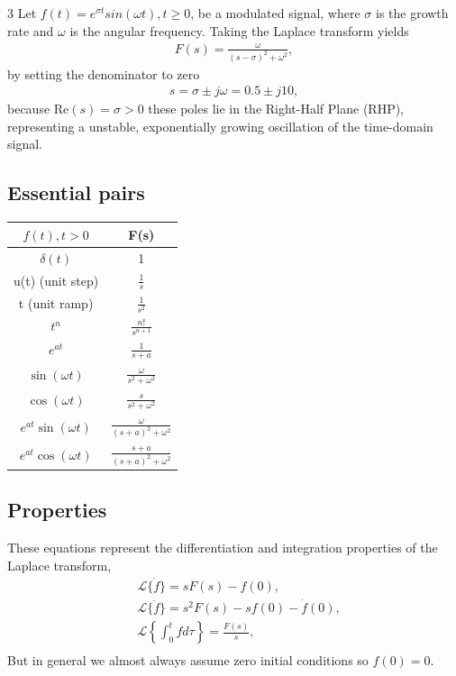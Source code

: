 \documentclass[10pt,landscape]{article}
\newcommand{\real}{\textrm{Re}}
\begin{document}
\begin{multicols*}{3}
    Let $f(t)=e^{\sigma t}sin(\omega t), t\geq0$, be a modulated signal, where $\sigma$ is the growth rate and $\omega$ is the angular frequency.
    Taking the Laplace transform yields
    \begin{align*}
        F(s)=\frac{\omega}{(s-\sigma)^2+\omega^2},
    \end{align*}
    by setting the denominator to zero
    \begin{align*}
        \boxed{s = \sigma \pm j\omega = 0.5 \pm j10},
    \end{align*}
    because $\real(s)=\sigma>0$ these poles lie in the Right-Half Plane (RHP), representing a unstable, exponentially growing oscillation of the time-domain signal. 
    
    \subsection{Essential pairs}

    \renewcommand{\arraystretch}{1.3}
    \begin{center}
    \begin{tabular}{cc}
    \hline
    $f(t), t>0 $                & F(s)        \\
        \hline
        $\delta (t)$            & 1           \\
        u(t) (unit step)        & $\frac{1}{s}$ \\ 
        t (unit ramp)           & $\frac{1}{s^2}$ \\ 
        $t^n$                   & $\frac{n!}{s^{n+1}}$ \\
        $e^{at}$                & $\frac{1}{s+a}$ \\
        $\sin (\omega t)$       & $\frac{\omega}{s^2+\omega^2}$ \\
        $\cos (\omega t)$       & $\frac{s}{s^2+\omega^2}$ \\
        $e^{at}\sin (\omega t)$ & $\frac{\omega}{(s+a)^2+\omega^2}$ \\
        $e^{at}\cos (\omega t)$ & $\frac{s+a}{(s+a)^2+\omega^2}$ \\

    \end{tabular}
    \end{center}

    \subsection{Properties}
    These equations represent the differentiation and integration properties of the Laplace transform,
    \begin{align*}
        &\mathcal{L}\{\dot{f}\} =sF(s)-f(0), \\
        &\mathcal{L}\{\ddot{f}\}=s^2F(s)-sf(0)-\dot{f}(0), \\
        &\mathcal{L}\left\{\int_0^t f d\tau \right\}=\frac{F(s)}{s}, \\
    \end{align*}
    But in general we almost always assume zero initial conditions so $f(0)=0$.
    \newline


\end{multicols*}
\end{document}
